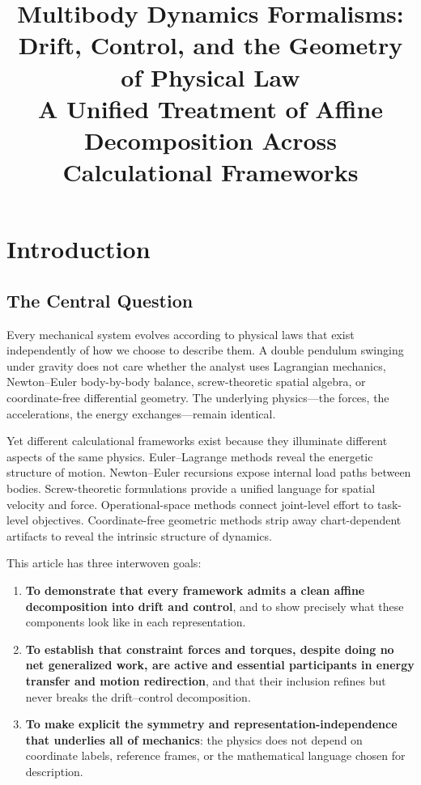 \documentclass[11pt]{article}
\title{Multibody Dynamics Formalisms:\\Drift, Control, and the Geometry of Physical Law\\[0.5em]
\large A Unified Treatment of Affine Decomposition Across Calculational Frameworks}
\author{}
\date{}
\begin{document}
\maketitle
\tableofcontents
\newpage

\section{Introduction}\label{sec:introduction}

\subsection{The Central Question}

Every mechanical system evolves according to physical laws that exist independently of how we choose to describe them.
A double pendulum swinging under gravity does not care whether the analyst uses Lagrangian mechanics, Newton--Euler body-by-body balance, screw-theoretic spatial algebra, or coordinate-free differential geometry.
The underlying physics---the forces, the accelerations, the energy exchanges---remain identical.

Yet different calculational frameworks exist because they illuminate different aspects of the same physics.
Euler--Lagrange methods reveal the energetic structure of motion.
Newton--Euler recursions expose internal load paths between bodies.
Screw-theoretic formulations provide a unified language for spatial velocity and force.
Operational-space methods connect joint-level effort to task-level objectives.
Coordinate-free geometric methods strip away chart-dependent artifacts to reveal the intrinsic structure of dynamics.

This article has three interwoven goals:

\begin{enumerate}
\item \textbf{To demonstrate that every framework admits a clean affine decomposition into drift and control}, and to show precisely what these components look like in each representation.

\item \textbf{To establish that constraint forces and torques, despite doing no net generalized work, are active and essential participants in energy transfer and motion redirection}, and that their inclusion refines but never breaks the drift--control decomposition.

\item \textbf{To make explicit the symmetry and representation-independence that underlies all of mechanics}: the physics does not depend on coordinate labels, reference frames, or the mathematical language chosen for description.
\end{enumerate}
\end{document}
